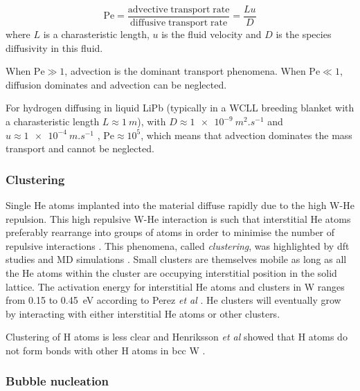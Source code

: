 \begin{equation}
    \mathrm{Pe} = \frac{\mathrm{advective \; transport \; rate}}{\mathrm{diffusive \; transport \; rate}} = \frac{L u}{D}
\end{equation}
where $L$ is a charasteristic length, $u$ is the fluid velocity and $D$ is the species diffusivity in this fluid.

When $\mathrm{Pe} \gg 1$, \gls{advection} is the dominant transport phenomena.
When $\mathrm{Pe} \ll 1$, \gls{diffusion} dominates and \gls{advection} can be neglected.

For hydrogen diffusing in liquid LiPb (typically in a WCLL breeding blanket with a charasteristic length $L \approx \SI{1}{m}$), with $D \approx \SI{1e-9}{m^2.s^{-1}}$ and $u \approx \SI{1e-4}{m.s^{-1}}$ , $\mathrm{Pe} \approx 10^{5}$, which means that \gls{advection} dominates the mass transport and cannot be neglected.

\subsubsection{Clustering}
Single He atoms implanted into the material diffuse rapidly due to the high W-He repulsion.
This high repulsive W-He interaction is such that interstitial He atoms preferably rearrange into groups of atoms in order to minimise the number of repulsive interactions .
This phenomena, called \emph{clustering}, was highlighted by \gls{dft} studies \cite{becquart_density_2009,dunn_rate_2013} and MD simulations \cite{henriksson_molecular_2006}.
Small clusters are themselves mobile as long as all the He atoms within the cluster are occupying interstitial position in the solid \gls{lattice}.
The activation energy for interstitial He atoms and clusters in \gls{W} ranges from 0.15 to \SI{0.45}{eV} according to Perez \textit{et al} .
He clusters will eventually grow by interacting with either interstitial He atoms or other clusters.

Clustering of \gls{H} atoms is less clear and Henriksson \textit{et al} showed that \gls{H} atoms do not form bonds with other \gls{H} atoms in \gls{bcc} \gls{W} .

\subsubsection{Bubble nucleation}

